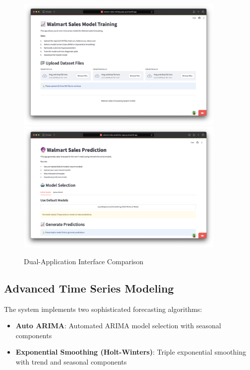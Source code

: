 \begin{figure}[H]
    \centering
  \includegraphics[width=0.9\textwidth]{Images/01IntroductionAndMainFunction/TrainingAppMainInterface.png}
  \includegraphics[width=0.9\textwidth]{Images/01IntroductionAndMainFunction/PredictionAppMainInterface.png}
    \caption{Dual-Application Interface Comparison}
    \label{fig:application_overview}
\end{figure}

\subsection{Advanced Time Series Modeling}

The system implements two sophisticated forecasting algorithms:

\begin{itemize}
    \item \textbf{Auto ARIMA}: Automated ARIMA model selection with seasonal components
    \item \textbf{Exponential Smoothing (Holt-Winters)}: Triple exponential smoothing with trend and seasonal components
\end{itemize}

